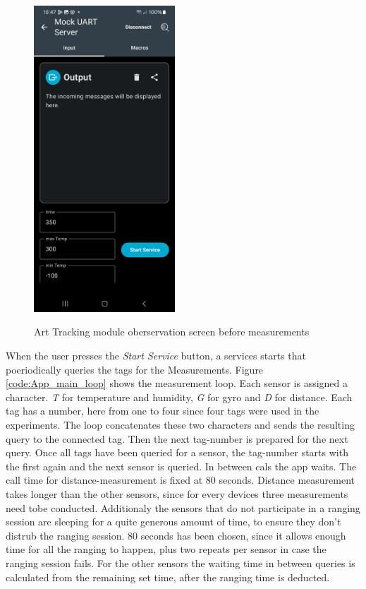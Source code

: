 \begin{figure}[ht!]
\centering
 \caption{Art Tracking module oberservation screen before measurements}
\includegraphics[width=200px]{graphics/nRF_toolbox_art_tracking_empty.jpg}
\label{f:Toolbox_art_tracking_empty}
\end{figure}


When the user presses the \textit{Start Service} button, a services starts that poeriodically queries the tags for the Measurements.
Figure \ref{code:App_main_loop} shows the measurement loop.
Each sensor is assigned a character.
\textit{T} for temperature and humidity, \textit{G} for gyro and \textit{D} for distance.
Each tag has a number, here from one to four since four tags were used in the experiments.
The loop concatenates these two characters and sends the resulting query to the connected tag.
Then the next tag-number is prepared for the next query.
Once all tags have been queried for a sensor, the tag-number starts with the first again and the next sensor is queried.
In between cals the app waits.
The call time for distance-measurement is fixed at 80 seconds.
Distance measurement takes longer than the other sensors, since for every devices three measurements need tobe conducted.
Additionaly the sensors that do not participate in a ranging session are sleeping for a quite generous amount of time, to ensure they don't distrub the ranging session.
80 seconds has been chosen, since it allows enough time for all the ranging to happen, plus two repeats per sensor in case the ranging session fails.
For the other sensors the waiting time in between queries is calculated from the remaining set time, after the ranging time is deducted.

